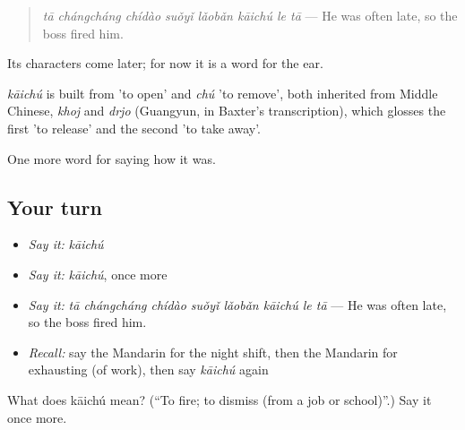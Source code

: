 \begin{quote}
\emph{tā chángcháng chídào suǒyǐ lǎobǎn kāichú le tā} — He was often late, so the boss fired him.
\end{quote}

Its characters come later; for now it is a word for the ear.

\begin{cousinweb}
\emph{kāichú} is built from  'to open' and \emph{chú} 'to remove', both inherited from Middle Chinese, \emph{khoj} and \emph{drjo} (Guangyun, in Baxter's transcription), which glosses the first 'to release' and the second 'to take away'.
\end{cousinweb}

\begin{grammarlens}[title={What you've built}]
One more word for saying how it was.
\end{grammarlens}

\subsection*{Your turn}
\begin{itemize}
\raggedright
  \item \emph{Say it:} \emph{kāichú}
  \item \emph{Say it:} \emph{kāichú}, once more
  \item \emph{Say it:} \emph{tā chángcháng chídào suǒyǐ lǎobǎn kāichú le tā} — He was often late, so the boss fired him.
  \item \emph{Recall:} say the Mandarin for the night shift, then the Mandarin for exhausting (of work), then say \emph{kāichú} again
\end{itemize}

\begin{tcolorbox}[breakable,colback=teal!4,colframe=teal!35!black,title={Before you move on}]
What does kāichú mean? (\textquotedblleft{}To fire; to dismiss (from a job or school)\textquotedblright{}.) Say it once more.
\end{tcolorbox}
